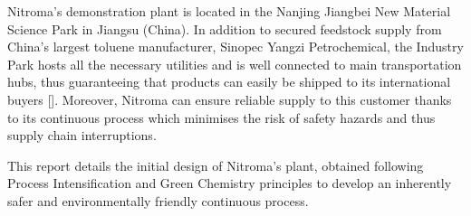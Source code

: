 Nitroma's demonstration plant is located in the Nanjing Jiangbei New Material Science Park in Jiangsu (China). In addition to secured feedstock supply from China’s largest toluene manufacturer, Sinopec Yangzi Petrochemical, the Industry Park hosts all the necessary utilities and is well connected to main transportation hubs, thus guaranteeing that products can easily be shipped to its international buyers []. Moreover, Nitroma can ensure reliable supply to this customer thanks to its continuous process which minimises the risk of safety hazards and thus supply chain interruptions.



This report details the initial design of Nitroma's plant, obtained following Process Intensification and Green Chemistry principles to develop an inherently safer and environmentally friendly continuous process.



